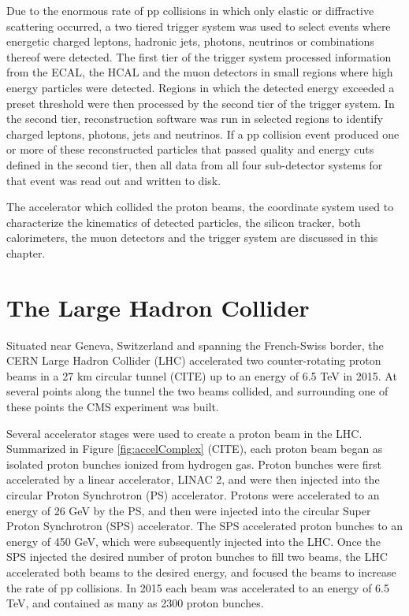 Due to the enormous rate of pp collisions in which only elastic or diffractive scattering occurred, a two tiered trigger 
system was used to select events where energetic charged leptons, hadronic jets, photons, neutrinos or combinations 
thereof were detected.  The first tier of the trigger system processed information from the ECAL, the HCAL and the muon 
detectors in small regions where high energy particles were detected.  Regions in which the detected energy exceeded 
a preset threshold were then processed by the second tier of the trigger system.  In the second tier, reconstruction software 
was run in selected regions to identify charged leptons, photons, jets and neutrinos.  If a pp collision event produced one 
or more of these reconstructed particles that passed quality and energy cuts defined in the second tier, then all data 
from all four sub-detector systems for that event was read out and written to disk.

The accelerator which collided the proton beams, the coordinate system used to characterize the kinematics of detected 
particles, the silicon tracker, both calorimeters, the muon detectors and the trigger system are discussed in this chapter.

\section{The Large Hadron Collider}
\label{sec:lhcDescription}
Situated near Geneva, Switzerland and spanning the French-Swiss border, the CERN Large Hadron Collider (LHC) accelerated 
two counter-rotating proton beams in a 27 km circular tunnel (CITE) up to an energy of 6.5 TeV in 2015.  At several points along the tunnel 
the two beams collided, and surrounding one of these points the CMS experiment was built.

Several accelerator stages were used to create a proton beam in the LHC.  Summarized in Figure \ref{fig:accelComplex} (CITE), each 
proton beam began as isolated proton bunches ionized from hydrogen gas.  Proton bunches were first accelerated by a linear 
accelerator, LINAC 2, and were then injected into the circular Proton Synchrotron (PS) accelerator.  Protons were accelerated 
to an energy of 26 GeV by the PS, and then were injected into the circular Super Proton Synchrotron (SPS) accelerator.  
The SPS accelerated proton bunches to an energy of 450 GeV, which were subsequently injected into the LHC.  Once the SPS 
injected the desired number of proton bunches to fill two beams, the LHC accelerated both beams to the desired energy, 
and focused the beams to increase the rate of pp collisions.  In 2015 each beam was accelerated to an energy of 6.5 TeV, and 
contained as many as 2300 proton bunches.

